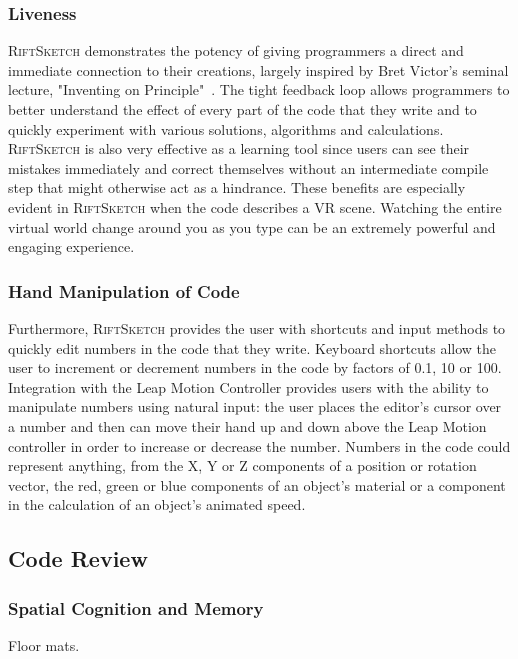 \documentclass[conference]{IEEEtran}
\begin{document}
\subsubsection{Liveness}

\textsc{RiftSketch} demonstrates the potency of giving programmers a direct and immediate connection to their creations, largely inspired by Bret Victor's seminal lecture, "Inventing on Principle"~\cite{Victor:InventingOnPrincipleVideo}\cite{Victor:InventingOnPrincipleTranscript}.
The tight feedback loop allows programmers to better understand the effect of every part of the code that they write and to quickly experiment with various solutions, algorithms and calculations. 
\textsc{RiftSketch} is also very effective as a learning tool since users can see their mistakes immediately and correct themselves without an intermediate compile step that might otherwise act as a hindrance.  
These benefits are especially evident in \textsc{RiftSketch} when the code describes a VR scene. 
Watching the entire virtual world change around you as you type can be an extremely powerful and engaging experience.

\subsubsection{Hand Manipulation of Code}

Furthermore, \textsc{RiftSketch} provides the user with shortcuts and input methods to quickly edit numbers in the code that they write. 
Keyboard shortcuts allow the user to increment or decrement numbers in the code by factors of 0.1, 10 or 100. 
Integration with the Leap Motion Controller provides users with the ability to manipulate numbers using natural input: the user places the editor's cursor over a number and then can move their hand up and down above the Leap Motion controller in order to increase or decrease the number. 
Numbers in the code could represent anything, from the X, Y or Z components of a position or rotation vector, the red, green or blue components of an object's material or a component in the calculation of an object's animated speed.


\subsection{Code Review}

\subsubsection{Spatial Cognition and Memory}
Floor mats.
\end{document}
